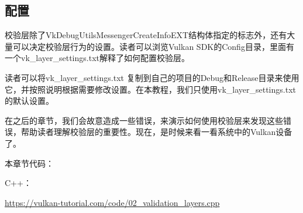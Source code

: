 \subsection{配置}

校验层除了VkDebugUtilsMessengerCreateInfoEXT结构体指定的标志外，还有大量可以决定校验层行为的设置。读者可以浏览Vulkan SDK的Config目录，里面有一个vk\_layer\_settings.txt解释了如何配置校验层。

读者可以将vk\_layer\_settings.txt 复制到自己的项目的Debug和Release目录来使用它，并按照说明根据需要修改设置。在本教程，我们只使用vk\_layer\_settings.txt的默认设置。

在之后的章节，我们会故意造成一些错误，来演示如何使用校验层来发现这些错误，帮助读者理解校验层的重要性。现在，是时候来看一看系统中的Vulkan设备了。

本章节代码：

C++：

\url{https://vulkan-tutorial.com/code/02_validation_layers.cpp}

\newpage
